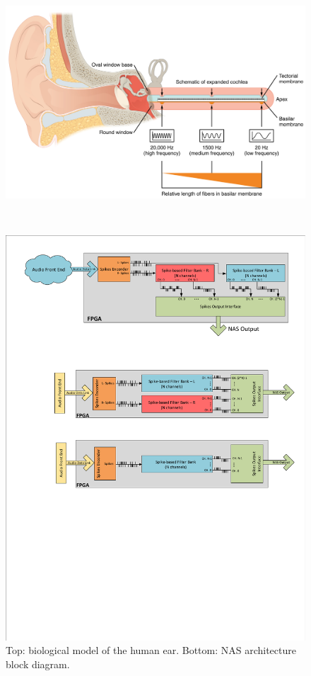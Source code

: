 \begin{figure}[H]
  \centering
  \begin{minipage}[b]{0.8\textwidth}
    \centering
    \includegraphics[width=1\textwidth]{biological_ear_model.jpg}
    \label{fig:biological_model}
  \end{minipage}
  \\%
  \begin{minipage}[b]{1\textwidth}
    \centering
    \includegraphics[width=1\textwidth]{NAS_full_arch_stereo.pdf}
    \caption{Top: biological model of the human ear. Bottom: NAS architecture block diagram.}
    \label{fig:nas_block_diagram}
  \end{minipage}
\end{figure}


